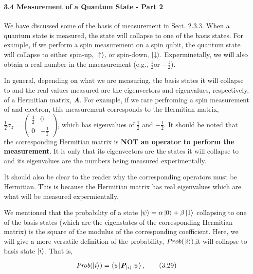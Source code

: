\documentclass{article}
\begin{document}
\textbf{\Large 3.4 Measurement of a Quantum State - Part 2}
\\ \\
We have discussed some of the basis of measurement in Sect. 2.3.3. 
When a quantum state is measured, the state will collapse to one of the
basis states. For example, if we perform a spin measurement on a spin qubit, the quantum state will collapse
to either spin-up, $\ket{\uparrow}$, or spin-down, $\ket{\downarrow}$.
Experminetally, we will also obtain a real number in the maeasurement (e.g., $\frac{1}{2}$or $-\frac{1}{2}$).

In general, depending on what we are measuring, the basis states it will collapse
to and the real values measured are the eigenvectors and eigenvalues, respectively, of 
a Hermitian matrix, \textit{\textbf{A}}. For example, if we rare perfroming a spin measurement of and electron,
this measurement corresponds to the Hermitian matrix, $\frac{1}{2}\sigma_z=\begin{pmatrix}
    \frac{1}{2} & 0\\0 & -\frac{1}{2}
\end{pmatrix}$,
which has eigenvalues of $\frac{1}{2}$ and $-\frac{1}{2}$. It should
be noted that the corresponding Hermitian matrix is \textbf{NOT an operator to perform the measurement}.
It is only that its eigenvectors are the states it will collapse to  and its eigenvalues are 
the numbers being measured experimentally.

It should also be clear to the reader why the corresponding operators must be
Hermitian. This is because the Hermitian matrix has real eigenvalues which
are what will be measured expermientally.

We mentioned that the probability of a state $\ket{\psi}=\alpha\ket{0}+\beta\ket{1}$
collapsing to one of the basis states (which are the eigenstates of the corresponding Hermitian matrix)
is the square of the modulus of the corresponding coefficient. Here, we will give a more versatile
definition of the probability, \textit{$Prob(\ket{i})$},it will collapse to basis
state $\ket{i}$. That is,

\begin{equation} \label{eq 3.29}
    \textit{Prob}(\ket{i})=\braket{\psi|\textit{\textbf{P}}_{\ket{i}}|\psi}, \tag{3.29}
\end{equation}
\end{document}
